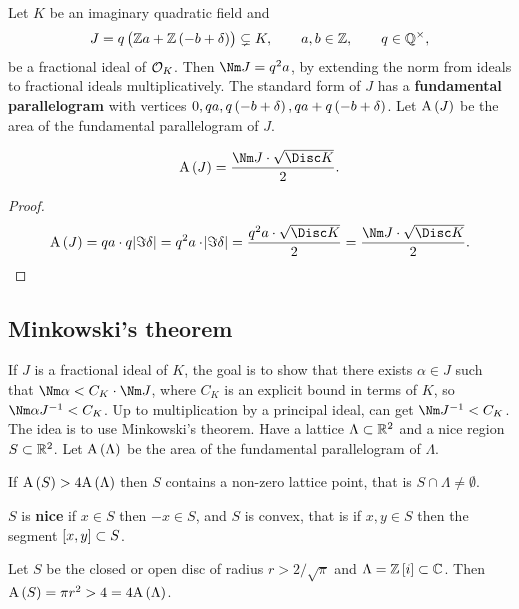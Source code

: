 Let $ K $ be an imaginary quadratic field and
$$ J = q\br{\ZZ a + \ZZ\br{-b + \delta}} \subsetneq K, \qquad a, b \in \ZZ, \qquad q \in \QQ^\times, $$
be a fractional ideal of $ \mathcal{O}_K $. Then $ \Nm J = q^2a $, by extending the norm from ideals to fractional ideals multiplicatively. The standard form of $ J $ has a \textbf{fundamental parallelogram} with vertices $ 0, qa, q\br{-b + \delta}, qa + q\br{-b + \delta} $. Let $ \A\br{J} $ be the area of the fundamental parallelogram of $ J $.

\begin{proposition}
$$ \A\br{J} = \dfrac{\Nm J \cdot \sqrt{\Disc K}}{2}. $$
\end{proposition}

\begin{proof}
$$ \A\br{J} = qa \cdot q\abs{\Im \delta} = q^2a \cdot \abs{\Im \delta} = \dfrac{q^2a \cdot \sqrt{\Disc K}}{2} = \dfrac{\Nm J \cdot \sqrt{\Disc K}}{2}. $$
\end{proof}

\subsection{Minkowski's theorem}

If $ J $ is a fractional ideal of $ K $, the goal is to show that there exists $ \alpha \in J $ such that $ \Nm \alpha < C_K \cdot \Nm J $, where $ C_K $ is an explicit bound in terms of $ K $, so $ \Nm \alpha J^{-1} < C_K $. Up to multiplication by a principal ideal, can get $ \Nm J^{-1} < C_K $. The idea is to use Minkowski's theorem. Have a lattice $ \Lambda \subset \mathbb{R}^2 $ and a nice region $ S \subset \mathbb{R}^2 $. Let $ \A\br{\Lambda} $ be the area of the fundamental parallelogram of $ \Lambda $.

\begin{theorem}
If $ \A\br{S} > 4\A\br{\Lambda} $ then $ S $ contains a non-zero lattice point, that is $ S \cap \Lambda \ne \emptyset $.
\end{theorem}

$ S $ is \textbf{nice} if $ x \in S $ then $ -x \in S $, and $ S $ is convex, that is if $ x, y \in S $ then the segment $ \sbr{x, y} \subset S $.

\begin{example*}
Let $ S $ be the closed or open disc of radius $ r > 2 / \sqrt{\pi} $ and $ \Lambda = \ZZ\sbr{i} \subset \CC $. Then $ \A\br{S} = \pi r^2 > 4 = 4\A\br{\Lambda} $.
\end{example*}


